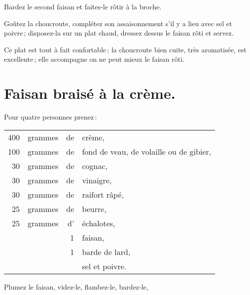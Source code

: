 Bardez le second faisan et faites-le rôtir à la broche.

Goûtez la choucroute, complétez son assaisonnement s'il y a lieu avec sel et
poivre ; disposez-la sur un plat chaud, dressez dessus le faisan rôti et
servez.

Ce plat est tout à fait confortable ; la choucroute bien cuite, très
aromatisée, est excellente ; elle accompagne on ne peut mieux le faisan rôti.

\section*{\centering Faisan braisé à la crème.}
{}

Pour quatre personnes prenez :

\footnotesize
\begin{longtable}{rrrp{16em}}
    400 & grammes & de & crème,                                                                           \\
    100 & grammes & de & fond de veau, de volaille ou de gibier,                                          \\
     30 & grammes & de & cognac,                                                                          \\
     30 & grammes & de & vinaigre,                                                                        \\
     30 & grammes & de & raifort râpé,                                                                    \\
     25 & grammes & de & beurre,                                                                          \\
     25 & grammes & d' & échalotes,                                                                       \\
        &         &  1 & faisan,                                                                          \\
        &         &  1 & barde de lard,                                                                   \\
        &         &    & sel et poivre.                                                                   \\
\end{longtable}
\normalsize

Plumez le faisan, videz-le, flambez-le, bardez-le,

